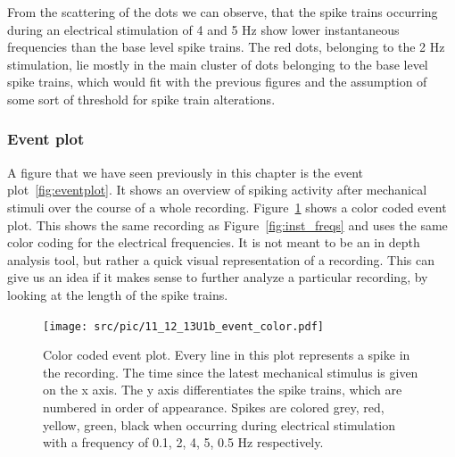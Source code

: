 From the scattering of the dots we can observe, that the spike trains occurring during an electrical stimulation of 4 and 5 Hz show lower instantaneous frequencies than the base level spike trains. The red dots, belonging to the 2 Hz stimulation, lie mostly in the main cluster of dots belonging to the base level spike trains, which would fit with the previous figures and the assumption of some sort of threshold for spike train alterations.

\subsubsection{Event plot}
A figure that we have seen previously in this chapter is the event plot~\ref{fig:eventplot}. It shows an overview of spiking activity after mechanical stimuli over the course of a whole recording. Figure~\ref{fig:event_color} shows a color coded event plot. This shows the same recording as Figure~\ref{fig:inst_freqs} and uses the same color coding for the electrical frequencies. It is not meant to be an in depth analysis tool, but rather a quick visual representation of a recording. This can give us an idea if it makes sense to further analyze a particular recording, by looking at the length of the spike trains.

\begin{figure}
	\texttt{[image: src/pic/11\_12\_13U1b\_event\_color.pdf]}
	\caption{Color coded event plot. Every line in this plot represents a spike in the recording. The time since the latest mechanical stimulus is given on the x axis. The y axis differentiates the spike trains, which are numbered in order of appearance. Spikes are colored grey, red, yellow, green, black when occurring during electrical stimulation with a frequency of 0.1, 2, 4, 5, 0.5 Hz respectively.}
	\label{fig:event_color}
\end{figure}







\cleardoublepage
